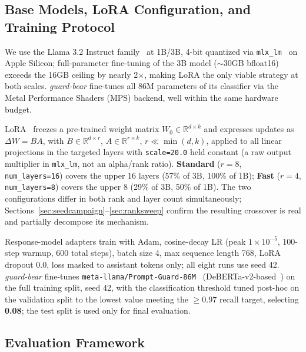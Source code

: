 \documentclass[pdflatex,sn-mathphys-num]{sn-jnl}%
\begin{document}
\subsection{Base Models, LoRA Configuration, and Training Protocol}\label{sec:trainprotocol}

We use the Llama 3.2 Instruct family~\cite{dubey2024llama3} at 1B/3B, 4-bit quantized via \texttt{mlx\_lm}~\cite{apple2023mlx} on Apple Silicon; full-parameter fine-tuning of the 3B model ($\sim$30GB bfloat16) exceeds the 16GB ceiling by nearly 2$\times$, making LoRA the only viable strategy at both scales. \textit{guard-bear} fine-tunes all 86M parameters of its classifier via the Metal Performance Shaders (MPS) backend, well within the same hardware budget.

LoRA~\cite{hu2022lora} freezes a pre-trained weight matrix $W_0 \in \mathbb{R}^{d\times k}$ and expresses updates as $\Delta W = BA$, with $B \in \mathbb{R}^{d\times r}$, $A \in \mathbb{R}^{r\times k}$, $r \ll \min(d,k)$, applied to all linear projections in the targeted layers with \texttt{scale=20.0} held constant (a raw output multiplier in \texttt{mlx\_lm}, not an alpha/rank ratio). \textbf{Standard} ($r=8$, \texttt{num\_layers=16}) covers the upper 16 layers (57\% of 3B, 100\% of 1B); \textbf{Fast} ($r=4$, \texttt{num\_layers=8}) covers the upper 8 (29\% of 3B, 50\% of 1B). The two configurations differ in both rank and layer count simultaneously; Sections~\ref{sec:seedcampaign}--\ref{sec:ranksweep} confirm the resulting crossover is real and partially decompose its mechanism.

Response-model adapters train with Adam, cosine-decay LR (peak $1\times10^{-5}$, 100-step warmup, 600 total steps), batch size 4, max sequence length 768, LoRA dropout 0.0, loss masked to assistant tokens only; all eight runs use seed 42. \textit{guard-bear} fine-tunes \texttt{meta-llama/Prompt-Guard-86M}~\cite{promptguard2024} (DeBERTa-v2-based~\cite{he2021deberta}) on the full training split, seed 42, with the classification threshold tuned post-hoc on the validation split to the lowest value meeting the $\geq 0.97$ recall target, selecting \textbf{0.08}; the test split is used only for final evaluation.

\subsection{Evaluation Framework}
\end{document}
